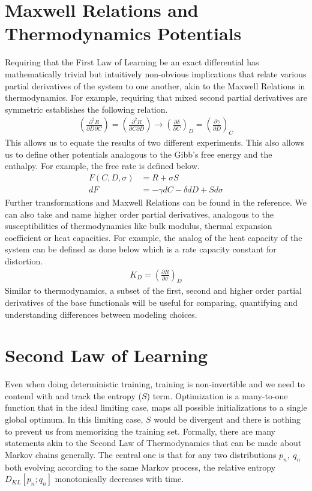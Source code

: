 \documentclass[book.tex]{subfiles}
\begin{document}
\section{Maxwell Relations and Thermodynamics Potentials}
Requiring that the First Law of Learning be an exact differential has mathematically trivial but intuitively non-obvious implications that relate various partial derivatives of the system to one another, akin to the Maxwell Relations in thermodynamics. For example, requiring that mixed second partial derivatives are symmetric establishes the following relation.
\begin{align}
\left(\frac{\partial^2 R}{\partial D\partial C}\right) = \left(\frac{\partial^2 R}{\partial C \partial D}\right) \longrightarrow \left(\frac{\partial \delta}{\partial C}\right)_D = \left(\frac{\partial \gamma}{\partial D}\right)_C
\end{align}
This allows us to equate the results of two different experiments. This also allows us to define other potentials analogous to the Gibb's free energy and the enthalpy. For example, the free rate is defined below.
\begin{align}
F(C,D,\sigma)&=R+\sigma S\\
dF &= -\gamma dC - \delta dD + Sd\sigma
\end{align}
Further transformations and Maxwell Relations can be found in the reference. We can also take and name higher order partial derivatives, analogous to the susceptibilities of thermodynamics like bulk modulus, thermal expansion coefficient or heat capacities. For example, the analog of the heat capacity of the system can be defined as done below which is a rate capacity constant for distortion.
\begin{align}
K_D=\left(\frac{\partial R}{\partial \sigma}\right)_D
\end{align}
Similar to thermodynamics, a subset of the first, second and higher order partial derivatives of the base functionals will be useful for comparing, quantifying and understanding differences between modeling choices.

\section{Second Law of Learning}
Even when doing deterministic training, training is non-invertible and we need to contend with and track the entropy ($S$) term. Optimization is a many-to-one function that in the ideal limiting case, maps all possible initializations to a single global optimum. In this limiting case, $S$ would be divergent and there is nothing to prevent us from memorizing the training set. Formally, there are many statements akin to the Second Law of Thermodynamics that can be made about Markov chains generally. The central one is that for any two distributions $p_n,\ q_n$ both evolving according to the same Markov process, the relative entropy $D_{KL}[p_n;q_n]$ monotonically decreases with time.
\end{document}
